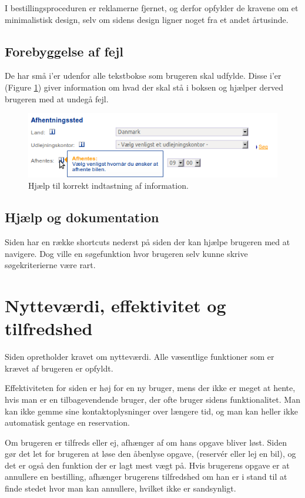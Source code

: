 \documentclass[a4paper]{article}
\begin{document}
I bestillingsproceduren er reklamerne fjernet, og derfor opfylder de kravene om
et minimalistisk design, selv om sidens design ligner noget fra et andet
årtusinde.

\subsection{Forebyggelse af fejl}
De har små i'er udenfor alle tekstbokse som brugeren skal udfylde. Disse i'er (Figure \ref{help_kontaktinformation})
giver information om hvad der skal stå i boksen og hjælper derved brugeren med at
undegå fejl.

\begin{figure}[htbp]
  \begin{center}
    \includegraphics[scale=.6]{7.png}
  \end{center}
  \caption{Hjælp til korrekt indtastning af information.}
  \label{help_kontaktinformation}
\end{figure}

\subsection{Hjælp og dokumentation}
Siden har en række shortcuts nederst på siden der kan hjælpe brugeren med at
navigere. Dog ville en søgefunktion hvor brugeren selv kunne skrive søgekriterierne
være rart.

\section{Nytteværdi, effektivitet og tilfredshed}
Siden opretholder kravet om nytteværdi. Alle væsentlige funktioner som er krævet
af brugeren er opfyldt.

Effektiviteten for siden er høj for en ny bruger, mens der ikke er meget at
hente, hvis man er en tilbagevendende bruger, der ofte bruger sidens
funktionalitet. Man kan ikke gemme sine kontaktoplysninger over længere tid, og
man kan heller ikke automatisk gentage en reservation.

Om brugeren er tilfreds eller ej, afhænger af om hans opgave bliver løst. Siden
gør det let for brugeren at løse den åbenlyse opgave, (reservér eller lej en
bil), og det er også den funktion der er lagt mest vægt på. Hvis brugerens
opgave er at annullere en bestilling, afhænger brugerens tilfredshed om han er i
stand til at finde stedet hvor man kan annullere, hvilket ikke er sandsynligt.
\end{document}
